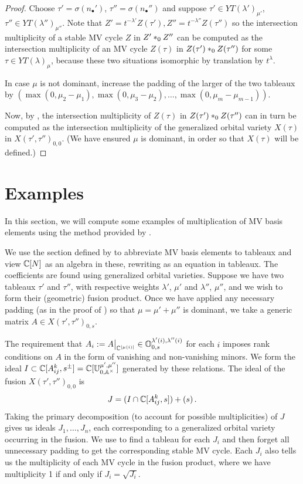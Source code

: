 \documentclass{article}
\begin{document}
\begin{proof}
Choose $\tau' = \sigma(n_\bullet')$, $\tau'' = \sigma(n_\bullet'')$ and suppose $\tau'\in YT(\lambda')_{\mu'}$, $\tau'' \in YT(\lambda'')_{\mu''}$. 
Note that $Z'= t^{-\lambda'}Z(\tau'), Z'' = t^{-\lambda''} Z(\tau'')$ so the intersection multiplicity of a stable MV cycle $Z$ in $Z'\ast_{0} Z''$ can be computed as the intersection multiplicity of an MV cycle $Z(\tau)$ in $Z(\tau')\ast_{0} Z(\tau'')$ for some $\tau\in YT(\lambda)_\mu$, because these two situations isomorphic by translation by $ t^\lambda$. 

In case $\mu$ is not dominant, increase the padding of the larger of the two tableaux by $(\max(0,\mu_2-\mu_1),\max(0,\mu_3 - \mu_2),\dots,\max(0,\mu_m-\mu_{m-1}))$. 

Now, by , the intersection multiplicity of $Z(\tau)$ in $Z(\tau')\ast_{0} Z(\tau'')$ can in turn be computed as the intersection multiplicity of the generalized orbital variety $X(\tau)$ in $X(\tau',\tau'')_{0,0}$.  (We have ensured $ \mu $ is dominant, in order so that $X(\tau)$ will be defined.) 
\end{proof}
% 
\section{Examples}
\label{s:examples}

In this section, we will compute some examples of multiplication of MV basis elements using the method provided by .

We use the section defined by  to abbreviate MV basis elements to tableaux and view $\mathbb C[N]$ as an algebra in these, rewriting  as an equation in tableaux.
The coefficients are found using generalized orbital varieties.
Suppose we have two tableaux $\tau'$ and $\tau''$, with respective weights $\lambda'$, $\mu'$ and $\lambda''$, $\mu''$, and we wish to form their (geometric) fusion product. Once we have applied any necessary padding (as in the proof of ) so that $\mu = \mu' + \mu''$ is dominant, we take a generic matrix $A \in X(\tau', \tau'')_{0,s}$.

The requirement that $ A_i := A\big|_{\mathbb C^{|\mu(i)|}} \in \mathbb O^{\lambda'(i), \lambda''(i)}_{0,s}$ for each $i$ imposes rank conditions on $A$ in the form of vanishing and non-vanishing minors. We form the ideal $I\subset \mathbb C[A_{ij}^k, s^\pm] = \mathbb C[\mathbb U_{0, {\mathbb A^\times}}^{\mu', \mu''}]$ generated by these relations. The ideal of the fusion $ X(\tau', \tau'')_{0,0}$ is
$$
    J = (I \cap \mathbb C[A_{ij}^k,s]) + (s)\,.
$$ 
Taking the primary decomposition (to account for possible multiplicities) of $J$ gives us ideals $J_1,\dots,J_n$, each corresponding to a generalized orbital variety occurring in the fusion. We use  to find a tableau for each $J_i$ and then forget all unnecessary padding to get the corresponding stable MV cycle. 
Each $J_i$ also tells us the multiplicity of each MV cycle in the fusion product, where we have multiplicity 1 if and only if $J_i = \sqrt {J_i}$.
\end{document}

